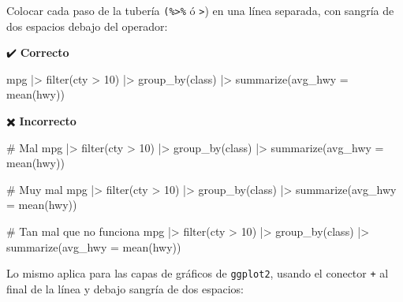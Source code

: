 \documentclass[
  spanish,
  a4paper,
]{scrbook}
\newenvironment{Shaded}{\begin{snugshade}}{\end{snugshade}}
\newcommand{\AttributeTok}[1]{\textcolor[rgb]{0.40,0.45,0.13}{#1}}
\newcommand{\CommentTok}[1]{\textcolor[rgb]{0.37,0.37,0.37}{#1}}
\newcommand{\DecValTok}[1]{\textcolor[rgb]{0.68,0.00,0.00}{#1}}
\newcommand{\FunctionTok}[1]{\textcolor[rgb]{0.28,0.35,0.67}{#1}}
\newcommand{\NormalTok}[1]{\textcolor[rgb]{0.00,0.23,0.31}{#1}}
\newcommand{\SpecialCharTok}[1]{\textcolor[rgb]{0.37,0.37,0.37}{#1}}
\begin{document}
Colocar cada paso de la tubería \texttt{(\%\textgreater{}\%} ó
\texttt{\textbar{}\textgreater{}}) en una línea separada, con sangría de
dos espacios debajo del operador:

✔️ \textbf{Correcto}

\begin{Shaded}
\begin{Highlighting}[]
\NormalTok{mpg }\SpecialCharTok{|\textgreater{}} 
  \FunctionTok{filter}\NormalTok{(cty }\SpecialCharTok{\textgreater{}} \DecValTok{10}\NormalTok{) }\SpecialCharTok{|\textgreater{}} 
  \FunctionTok{group\_by}\NormalTok{(class) }\SpecialCharTok{|\textgreater{}} 
  \FunctionTok{summarize}\NormalTok{(}\AttributeTok{avg\_hwy =} \FunctionTok{mean}\NormalTok{(hwy))}
\end{Highlighting}
\end{Shaded}

✖️ \textbf{Incorrecto}

\begin{Shaded}
\begin{Highlighting}[]
\CommentTok{\# Mal}
\NormalTok{mpg }\SpecialCharTok{|\textgreater{}} \FunctionTok{filter}\NormalTok{(cty }\SpecialCharTok{\textgreater{}} \DecValTok{10}\NormalTok{) }\SpecialCharTok{|\textgreater{}} \FunctionTok{group\_by}\NormalTok{(class) }\SpecialCharTok{|\textgreater{}} 
  \FunctionTok{summarize}\NormalTok{(}\AttributeTok{avg\_hwy =} \FunctionTok{mean}\NormalTok{(hwy))}

\CommentTok{\# Muy mal}
\NormalTok{mpg }\SpecialCharTok{|\textgreater{}} \FunctionTok{filter}\NormalTok{(cty }\SpecialCharTok{\textgreater{}} \DecValTok{10}\NormalTok{) }\SpecialCharTok{|\textgreater{}} \FunctionTok{group\_by}\NormalTok{(class) }\SpecialCharTok{|\textgreater{}} \FunctionTok{summarize}\NormalTok{(}\AttributeTok{avg\_hwy =} \FunctionTok{mean}\NormalTok{(hwy))}

\CommentTok{\# Tan mal que no funciona}
\NormalTok{mpg }\SpecialCharTok{|\textgreater{}} 
  \FunctionTok{filter}\NormalTok{(cty }\SpecialCharTok{\textgreater{}} \DecValTok{10}\NormalTok{)}
  \SpecialCharTok{|\textgreater{}} \FunctionTok{group\_by}\NormalTok{(class)}
  \SpecialCharTok{|\textgreater{}} \FunctionTok{summarize}\NormalTok{(}\AttributeTok{avg\_hwy =} \FunctionTok{mean}\NormalTok{(hwy))}
\end{Highlighting}
\end{Shaded}

Lo mismo aplica para las capas de gráficos de \texttt{ggplot2}, usando
el conector \texttt{+} al final de la línea y debajo sangría de dos
espacios:
\end{document}

